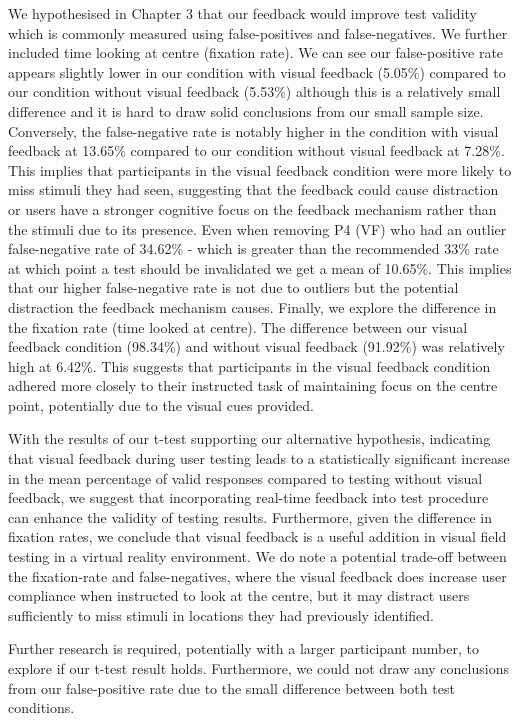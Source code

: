 \documentclass{l4proj}
\begin{document}
We hypothesised in Chapter 3 that our feedback would improve test validity which is commonly measured using false-positives and false-negatives. We further included time looking at centre (fixation rate). We can see our false-positive rate appears slightly lower in our condition with visual feedback (5.05\%) compared to our condition without visual feedback (5.53\%) although this is a relatively small difference and it is hard to draw solid conclusions from our small sample size. Conversely, the false-negative rate is notably higher in the condition with visual feedback at 13.65\% compared to our condition without visual feedback at 7.28\%. This implies that participants in the visual feedback condition were more likely to miss stimuli they had seen, suggesting that the feedback could cause distraction or users have a stronger cognitive focus on the feedback mechanism rather than the stimuli due to its presence. Even when removing P4 (VF) who had an outlier false-negative rate of 34.62\% - which is greater than the recommended 33\% rate at which point a test should be invalidated we get a mean of 10.65\%. This implies that our higher false-negative rate is not due to outliers but the potential distraction the feedback mechanism causes. Finally, we explore the difference in the fixation rate (time looked at centre). The difference between our visual feedback condition (98.34\%) and without visual feedback (91.92\%) was relatively high at 6.42\%. This suggests that participants in the visual feedback condition adhered more closely to their instructed task of maintaining focus on the centre point, potentially due to the visual cues provided. 

With the results of our t-test supporting our alternative hypothesis, indicating that visual feedback during user testing leads to a statistically significant increase in the mean percentage of valid responses compared to testing without visual feedback, we suggest that incorporating real-time feedback into test procedure can enhance the validity of testing results. Furthermore, given the difference in fixation rates, we conclude that visual feedback is a useful addition in visual field testing in a virtual reality environment. We do note a potential trade-off between the fixation-rate and false-negatives, where the visual feedback does increase user compliance when instructed to look at the centre, but it may distract users sufficiently to miss stimuli in locations they had previously identified.

Further research is required, potentially with a larger participant number, to explore if our t-test result holds. Furthermore, we could not draw any conclusions from our false-positive rate due to the small difference between both test conditions.  
\end{document}
